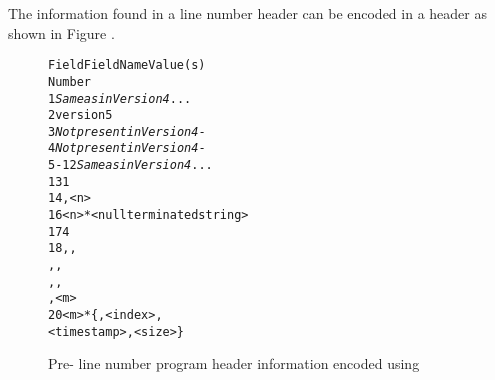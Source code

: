 The information found in a \DWARFVersionIV{} line number 
header can be encoded in a \DWARFVersionV{} header
as shown in Figure .

\begin{figure}[ht]
\begin{dwflisting}
\begin{alltt}
  Field           Field Name                      Value(s)
  Number
     1    \textit{Same as in Version 4}            ...
     2    version                         5
     3    \textit{Not present in Version 4}        -
     4    \textit{Not present in Version 4}        -
   5-12   \textit{Same as in Version 4}            ...
    13    \HFNdirectoryentryformatcount{}    1
    14    \HFNdirectoryentryformat{}          \DWLNCTpath,     \HFNdirectoriescount{}               <n>
    16    \HFNdirectories{}                     <n>*<null terminated string>
    17    \HFNfilenameentryformatcount{}    4
    18    \HFNfilenameentryformat{}          \DWLNCTpath, \DWFORMstring,
                                          \DWLNCTdirectoryindex, \DWFORMudata,
                                          \DWLNCTtimestamp, \DWFORMudata,
                                          \DWLNCTsize,     \HFNfilenamescount{}                <m>
    20    \HFNfilenames{}                      <m>*\{<null terminated string>, <index>, 
                                               <timestamp>, <size>\}
\end{alltt}
\end{dwflisting}
\begin{centering}
\caption{Pre-\DWARFVersionV{} line number program header information \mbox{encoded} using \DWARFVersionV}
\label{fig:preV5LNCTusingV5}
\end{centering}
\end{figure}

